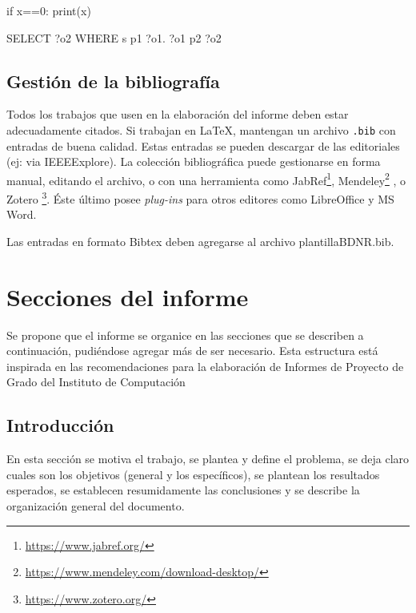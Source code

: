 \documentclass[journal,onecolumn]{IEEEtran}
\begin{document}
\begin{sflisting}[style=python, caption= Ejemplo de código Python,label=codigo1]
	if x==0:
	print(x)
	
\end{sflisting}

\begin{sflisting}[style=sparql,caption= Ejemplo de consulta SPARQL,label=codigo2]
	SELECT ?o2
	WHERE { s p1 ?o1.
		?o1 p2 ?o2
	}
\end{sflisting}


\subsection{Gestión de la bibliografía}

Todos los trabajos que usen en la elaboración del informe deben estar adecuadamente citados. Si trabajan en \LaTeX, mantengan un archivo \texttt{.bib} con entradas de buena calidad. Estas entradas se pueden descargar de las editoriales (ej: via IEEEExplore). La colección bibliográfica puede gestionarse en forma manual, editando el archivo, o con una herramienta como JabRef\footnote{\url{https://www.jabref.org/}}, Mendeley\footnote{\url{https://www.mendeley.com/download-desktop/}} , o Zotero \footnote{\url{https://www.zotero.org/}}. Éste último posee \textit{plug-ins} para otros editores como LibreOffice y MS Word.

Las entradas en formato Bibtex deben agregarse al archivo plantillaBDNR.bib.


\section{Secciones del informe}
\label{secciones}

Se propone que el informe se organice en las secciones que se describen a continuación, pudiéndose agregar más de ser necesario. Esta estructura está inspirada en las recomendaciones para la elaboración de Informes de Proyecto de Grado del Instituto de Computación \cite{Proygrado} 


\subsection{Introducción}
\label{intro}

En esta sección se motiva el trabajo, se plantea y define el problema, se deja claro   cuales   son   los   objetivos   (general y los   específicos),  se  plantean  los resultados esperados, se establecen resumidamente las conclusiones y se describe la organización general del documento.
\end{document}
